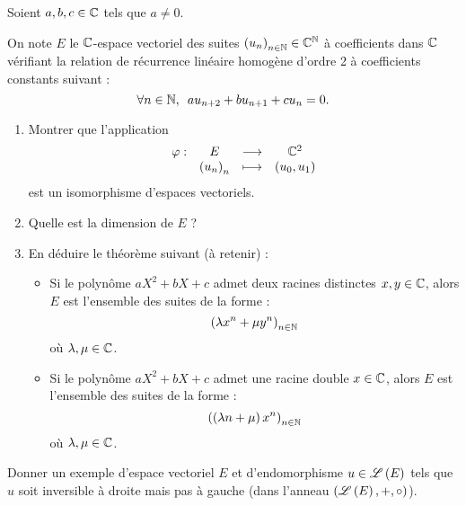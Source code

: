 \begin{exo}
Soient \(a,b,c\in\mathbb{C}\) tels que \(a\not=0\).

On note \(E\) le \(\mathbb{C}\)-espace vectoriel des suites \(\left(u_n\right)_{n\in\mathbb{N}}\in\mathbb{C}^{\mathbb{N}}\) à coefficients dans \(\mathbb{C}\) vérifiant la relation de récurrence linéaire homogène d'ordre 2 à coefficients constants suivant : \[\quantifs{\forall n\in\N}au_{n+2}+bu_{n+1}+cu_n=0.\]

\begin{enumerate}
\item Montrer que l'application \[\begin{array}[t]{cccc}\varphi : & E & \longrightarrow & \mathbb{C}^2 \\ & \left(u_n\right)_n & \longmapsto & \left(u_0,u_1\right)\end{array}\] est un isomorphisme d'espaces vectoriels. \\

\item Quelle est la dimension de \(E\) ? \\

\item En déduire le théorème suivant (à retenir) :

\begin{itemize}
\item Si le polynôme \(aX^2+bX+c\) admet deux racines distinctes \(x,y\in\mathbb{C}\), alors \(E\) est l'ensemble des suites de la forme : \[\left(\lambda x^n+\mu y^n\right)_{n\in\mathbb{N}}\] où \(\lambda,\mu\in\mathbb{C}\). \\

\item Si le polynôme \(aX^2+bX+c\) admet une racine double \(x\in\mathbb{C}\), alors \(E\) est l'ensemble des suites de la forme : \[\left(\left(\lambda n+\mu\right)x^n\right)_{n\in\mathbb{N}}\] où \(\lambda,\mu\in\mathbb{C}\).
\end{itemize}
\end{enumerate}
\end{exo}

\begin{corr}
\end{corr}

\begin{exo}
Donner un exemple d'espace vectoriel \(E\) et d'endomorphisme \(u\in\mathscr{L}\left(E\right)\) tels que \(u\) soit inversible à droite mais pas à gauche (dans l'anneau \(\anneau{\Lendo{E}}[+][\rond]\)).
\end{exo}

\begin{corr}
\end{corr}

